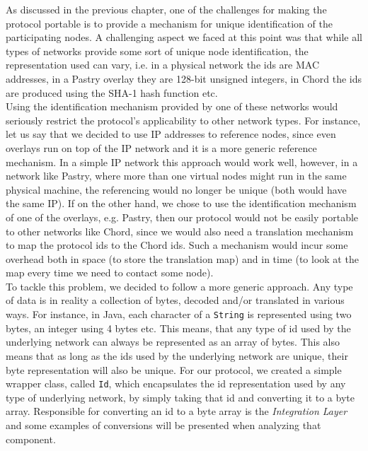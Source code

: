 \documentclass[a4paper,11pt,twoside]{report}
\newcommand{\classname}[1]{\texttt{#1}}
\begin{document}
As discussed in the previous chapter, one of the challenges for making the protocol portable is to provide a mechanism for unique identification of the participating nodes. A challenging aspect we faced at this point was that while all types of networks provide some sort of unique node identification, the representation used can vary, i.e. in a physical network the ids are MAC addresses, in a Pastry overlay they are 128-bit unsigned integers, in Chord the ids are produced using the SHA-1 hash function etc.\\

Using the identification mechanism provided by one of these networks would seriously restrict the protocol's applicability to other network types. For instance, let us say that we decided to use IP addresses to reference nodes, since even overlays run on top of the IP network and it is a more generic reference mechanism. In a simple IP network this approach would work well, however, in a network like Pastry, where more than one virtual nodes might run in the same physical machine, the referencing would no longer be unique (both would have the same IP). If on the other hand, we chose to use the identification mechanism of one of the overlays, e.g. Pastry, then our protocol would not be easily portable to other networks like Chord, since we would also need a translation mechanism to map the protocol ids to the Chord ids. Such a mechanism would incur some overhead both in space (to store the translation map) and in time (to look at the map every time we need to contact some node).\\

To tackle this problem, we decided to follow a more generic approach. Any type of data is in reality a collection of bytes, decoded and/or translated in various ways. For instance, in Java, each character of a \classname{String} is represented using two bytes, an integer using 4 bytes etc. This means, that any type of id used by the underlying network can always be represented as an array of bytes. This also means that as long as the ids used by the underlying network are unique, their byte representation will also be unique. For our protocol, we created a  simple wrapper class, called \classname{Id}, which encapsulates the id representation used by any type of underlying network, by simply taking that id and converting it to a byte array. Responsible for converting an id to a byte array is the \textit{Integration Layer} and some examples of conversions will be presented when analyzing that component. \\ 
\end{document}
